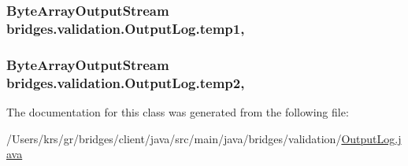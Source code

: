 \subsubsection[{temp1}]{\setlength{\rightskip}{0pt plus 5cm}Byte\+Array\+Output\+Stream bridges.\+validation.\+Output\+Log.\+temp1\hspace{0.3cm}{\ttfamily [static]}, {\ttfamily [protected]}}\label{classbridges_1_1validation_1_1_output_log_a142611812dd1ea095c4a1274bd40a93a}
\hypertarget{classbridges_1_1validation_1_1_output_log_ab1f0ab7e9ada60f29c4c4f59694c1163}{}
\subsubsection[{temp2}]{\setlength{\rightskip}{0pt plus 5cm}Byte\+Array\+Output\+Stream bridges.\+validation.\+Output\+Log.\+temp2\hspace{0.3cm}{\ttfamily [static]}, {\ttfamily [protected]}}\label{classbridges_1_1validation_1_1_output_log_ab1f0ab7e9ada60f29c4c4f59694c1163}


The documentation for this class was generated from the following file\+:\begin{DoxyCompactItemize}
\item 
/\+Users/krs/gr/bridges/client/java/src/main/java/bridges/validation/\hyperlink{_output_log_8java}{Output\+Log.\+java}\end{DoxyCompactItemize}
